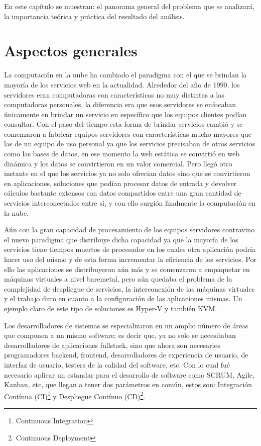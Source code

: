 \documentclass[../main/main.tex]{subfiles}
\begin{document}
\espacio

  En este capítulo se muestran: el panorama general del problema que se analizará, la importancia teórica y práctica del resultado del análisis.

  \section{Aspectos generales}

  La computación en la nube ha cambiado el paradigma con el que se brindan la mayoría de los servicios web en la actualidad. Alrededor del año de 1990, los servidores eran computadoras con características no muy distintas a las computadoras personales, la diferencia era que esos servidores se enfocaban únicamente en brindar un servicio en específico que los equipos clientes podían consultar. Con el paso del tiempo esta forma de brindar servicios cambió y se comenzaron a fabricar equipos servidores con características mucho mayores que las de un equipo de uso personal ya que los servicios precisaban de otros servicios como las bases de datos, en ese momento la web estática se convirtió en web dinámica y los datos se convirtieron en un valor comercial. Pero llegó otro instante en el que los servicios ya no solo ofrecian datos sino que se convirtieron en aplicaciones, soluciones que podían procesar datos de entrada y devolver cálculos bastante extensos con datos compartidos entre una gran cantidad de servicios interconectados entre sí, y con ello surgión finalmente la computación en la nube.

  Aún con la gran capacidad de procesamiento de los equipos servidores contravino el nuevo paradigma que distribuye dicha capacidad ya que la mayoría de los servicios tiene tiempos muertos de procesador en los cuales otra aplicación podría hacer uso del mismo y de esta forma incrementar la eficiencia de los servicios. Por ello las aplicaciones se distribuyeron aún más y se comenzaron a empaquetar en máquinas virtuales a nivel baremetal, pero aún quedaba el problema de la complejidad de despliegue de servicios, la interconexión de las máquinas virtuales y el trabajo duro en cuanto a la configuración de las aplicaciones mismas. Un ejemplo claro de este tipo de soluciones es Hyper-V y también KVM.

  Los desarrolladores de sistemas se especializaron en un amplio número de áreas que componen a un mismo software; es decir que, ya no solo se necesitaban desarrolladores de aplicaciones fullstack, sino que ahora son necesarios programadores backend, frontend, desarrolladores de experiencia de usuario, de interfaz de usuario, testers de la calidad del software, etc. Con lo cual fué necesario aplicar un estandar para el desarrollo de software como SCRUM, Agile, Kanban, etc, que llegan a tener dos parámetros en común, estos son: Integración Contínua (CI)\footnote{Continuous Integration} y Despliegue Contínuo (CD)\footnote{Continuous Deployment}.
\end{document}
